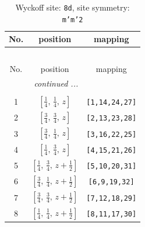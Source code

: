 \documentclass[fleqn,8pt]{jsarticle}
\begin{document}
\begin{longtable}{ccc}
\caption{Wyckoff site: {\tt 8d}, site symmetry: {\tt m'm'2}}
 \\
 \hline \hline
No. & position & mapping \\ \hline \endfirsthead

\multicolumn{2}{l}{\tablename\ \thetable{}} \\
 \hline \hline
No. & position & mapping \\ \hline \endhead

 \hline \hline
\multicolumn{2}{r}{\footnotesize\it continued ...} \\ \endfoot

 \hline \hline
\multicolumn{2}{r}{} \\ \endlastfoot

1 & $\left[ \frac{1}{4},\, \frac{1}{4},\, z \right]$ & {\tt [1,14,24,27]} \\ \hline
2 & $\left[ \frac{3}{4},\, \frac{3}{4},\, z \right]$ & {\tt [2,13,23,28]} \\ \hline
3 & $\left[ \frac{3}{4},\, \frac{1}{4},\, z \right]$ & {\tt [3,16,22,25]} \\ \hline
4 & $\left[ \frac{1}{4},\, \frac{3}{4},\, z \right]$ & {\tt [4,15,21,26]} \\ \hline
5 & $\left[ \frac{1}{4},\, \frac{3}{4},\, z + \frac{1}{2} \right]$ & {\tt [5,10,20,31]} \\ \hline
6 & $\left[ \frac{3}{4},\, \frac{1}{4},\, z + \frac{1}{2} \right]$ & {\tt [6,9,19,32]} \\ \hline
7 & $\left[ \frac{3}{4},\, \frac{3}{4},\, z + \frac{1}{2} \right]$ & {\tt [7,12,18,29]} \\ \hline
8 & $\left[ \frac{1}{4},\, \frac{1}{4},\, z + \frac{1}{2} \right]$ & {\tt [8,11,17,30]} \\
\end{longtable}
\renewcommand{\arraystretch}{1.2}
\end{document}
